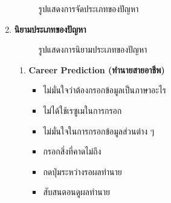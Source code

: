 \begin{enumerate}
\begin{figure}[H]
              \caption{รูปแสดงการจัดประเภทของปัญหา}\label{fig:Groping}
          \end{figure}
    \item \textbf{นิยามประเภทของปัญหา}
          \begin{figure}[H]\centering
              \caption{รูปแสดงการนิยามประเภทของปัญหา}\label{fig:CreateTheme}
          \end{figure}
          \begin{enumerate}
              \item \textbf{Career Prediction (ทำนายสายอาชีพ)}
                    \begin{itemize}
                        \item ไม่มั่นใจว่าต้องกรอกข้อมูลเป็นภาษาอะไร
                        \item ไม่ได้ใช้เรซูเมในการกรอก
                        \item ไม่มั่นใจในการกรอกข้อมูลส่วนต่าง ๆ
                        \item กรอกสิ่งที่คาดไม่ถึง
                        \item กดปุ่มระหว่างรอผลทำนาย
                        \item สับสนตอนดูผลทำนาย

\end{itemize}
\end{enumerate}
\end{enumerate}
